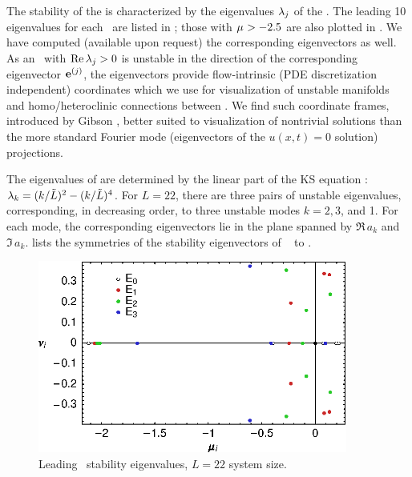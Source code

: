 The stability of the {\eqva} is characterized by the eigenvalues
$\eigExp[j]$ of the \stabmat.  The leading 10 eigenvalues for each
\eqv\ are listed in ;
those with $\eigRe > -2.5$ are also plotted in
.
We have computed (available upon request) the corresponding
eigenvectors as well. As an \eqv\ with $\mathrm{Re}\,
\Lyap_j > 0$ is unstable in the direction of the
corresponding eigenvector $\jEigvec{j}$, the eigenvectors
provide flow-intrinsic (PDE discretization independent)
coordinates which we use for visualization of unstable
manifolds and homo/heteroclinic connections between \eqva.
We find such coordinate frames, introduced by
Gibson \etal{}, better suited to visualization
of nontrivial solutions than the more standard Fourier mode
(eigenvectors of the $u(x,t)=0$ solution) projections.


The eigenvalues of  are determined by the linear part of the KS
equation : $\Lyap_k=(k/\tilde{L})^2-(k/\tilde{L})^4$.
For $L=22$, there are three pairs of unstable eigenvalues, corresponding,
in decreasing order, to three unstable modes $k=2,3$, and 1.  For each
mode, the corresponding eigenvectors lie in the plane spanned by
$\Re \, a_k$ and $\Im \, a_k$. 
lists the symmetries of the stability eigenvectors of
\eqva\  to .

\begin{figure}[t]
\begin{center}
\includegraphics[width=4in]{figs/L22-eqvaEigenvalues.eps}
\end{center}
\caption{
Leading  \eqv\ stability eigenvalues,
$L=22$ system size.
}
\label{f:KS22EkEigs}
\end{figure}

